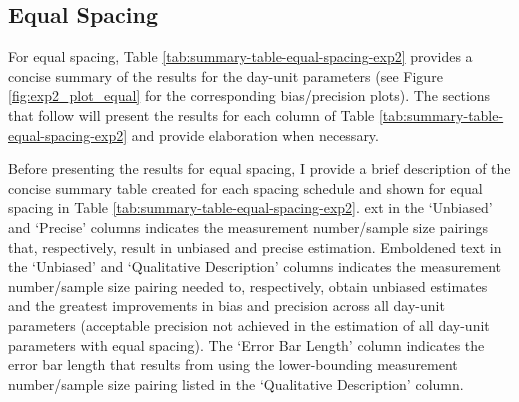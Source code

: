 \documentclass[
12pt, %
twoside,
english]{guelphthesis}
\begin{document}
\hypertarget{concise-example}{%
\subsection{Equal Spacing}\label{concise-example}}

For equal spacing, Table \ref{tab:summary-table-equal-spacing-exp2} provides a concise summary of the results for the day-unit parameters (see Figure \ref{fig:exp2_plot_equal} for the corresponding bias/precision plots). The sections that follow will present the results for each column of Table \ref{tab:summary-table-equal-spacing-exp2} and provide elaboration when necessary.

Before presenting the results for equal spacing, I provide a brief description of the concise summary table created for each spacing schedule and shown for equal spacing in Table \ref{tab:summary-table-equal-spacing-exp2}. ext in the `Unbiased' and `Precise' columns indicates the measurement number/sample size pairings that, respectively, result in unbiased and precise estimation. Emboldened text in the `Unbiased' and `Qualitative Description' columns indicates the measurement number/sample size pairing needed to, respectively, obtain unbiased estimates and the greatest improvements in bias and precision across all day-unit parameters (acceptable precision not achieved in the estimation of all day-unit parameters with equal spacing). The `Error Bar Length' column indicates the error bar length that results from using the lower-bounding measurement number/sample size pairing listed in the `Qualitative Description' column.
\end{document}
